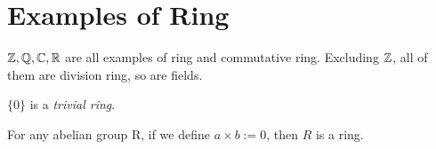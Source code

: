 \section{Examples of Ring}
\begin{eg}
    $\mathbb{Z}, \mathbb{Q}, \mathbb{C}, \mathbb{R}$ are all examples of ring and commutative ring. Excluding $\mathbb{Z}$, all of them are division ring, so are fields.
\end{eg}
\begin{eg}
    $\{0\}$ is a \textit{trivial ring}.
\end{eg}
\begin{eg}
    For any abelian group R, if we define $a \times b := 0$, then $R$ is a ring.
\end{eg}